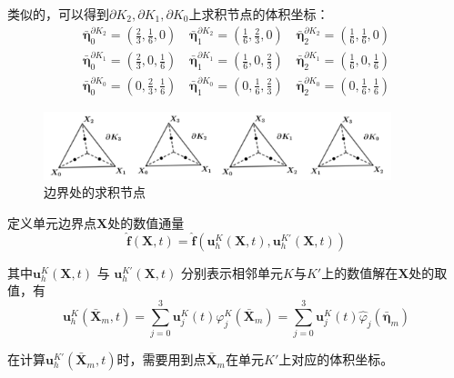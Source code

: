 \documentclass[a4paper, 12pt, UTF8]{ctexart}
\newcommand{\bs}[1]{\boldsymbol{#1}}
\begin{document}
类似的，可以得到$\partial K_{2}, \partial K_{1}, \partial K_{0}$上求积节点的体积坐标：
\begin{equation}
\begin{split}
\bar{\bs{\eta}}_{0}^{\partial K_{2}}=\left(\frac{2}{3}, \frac{1}{6}, 0\right) \quad \bar{\bs{\eta}}_{1}^{\partial K_{2}}=\left(\frac{1}{6}, \frac{2}{3}, 0\right) \quad \bar{\bs{\eta}}_{2}^{\partial K_{2}}=\left(\frac{1}{6}, \frac{1}{6}, 0\right) \\
\bar{\bs{\eta}}_{0}^{\partial K_{1}}=\left(\frac{2}{3}, 0, \frac{1}{6}\right) \quad \bar{\bs{\eta}}_{1}^{\partial K_{1}}=\left(\frac{1}{6}, 0, \frac{2}{3}\right) \quad \bar{\bs{\eta}}_{2}^{\partial K_{1}}=\left(\frac{1}{6}, 0, \frac{1}{6}\right) \\
\bar{\bs{\eta}}_{0}^{\partial K_{0}}=\left(0, \frac{2}{3}, \frac{1}{6}\right) \quad \bar{\bs{\eta}}_{1}^{\partial K_{0}}=\left(0, \frac{1}{6}, \frac{2}{3}\right) \quad \bar{\bs{\eta}}_{2}^{\partial K_{0}}=\left(0, \frac{1}{6}, \frac{1}{6}\right)
\end{split}
\end{equation}


\begin{figure}[!ht]
\centering
\includegraphics[width=0.9\textwidth]{images/2.jpg}
\caption{边界处的求积节点}
\label{IntegrationBoundaryPoint}
\end{figure}

定义单元边界点$\bs{X}$处的数值通量
\begin{equation}
\hat{\bs f}(\bs{X}, t)=\hat{\bs f}\left({\bs u_{h}^{K}\left(\bs{X}, t\right)}, {\bs u_{h}^{K'}\left(\bs{X}, t\right)}\right)
\end{equation}

其中$\bs u_{h}^{K}\left(\bs{X}, t\right)$ 与 $\bs u_{h}^{K'}\left(\bs{X}, t\right)$ 分别表示相邻单元$K$与$K'$上的数值解在$\bs{X}$处的取值，有
\begin{equation}
\bs{u}_{h}^{K}\left(\bar{\bs{X}}_{m}, t\right)=\sum\limits_{j=0}^{3} \bs{u}_{j}^{K}(t) \varphi_{j}^{K}\left(\bar{\bs{X}}_{m}\right)=\sum\limits_{j=0}^{3} \bs{u}_{j}^{K}(t) \hat{\varphi}_{j}\left(\bar{\bs{\eta}}_{m}\right)
\end{equation}

在计算$\bs{u}_{h}^{K'}\left(\bar{\bs{X}}_{m}, t\right)$时，需要用到点$\bar{\bs{X}}_{m}$在单元$K'$上对应的体积坐标。
\end{document}
